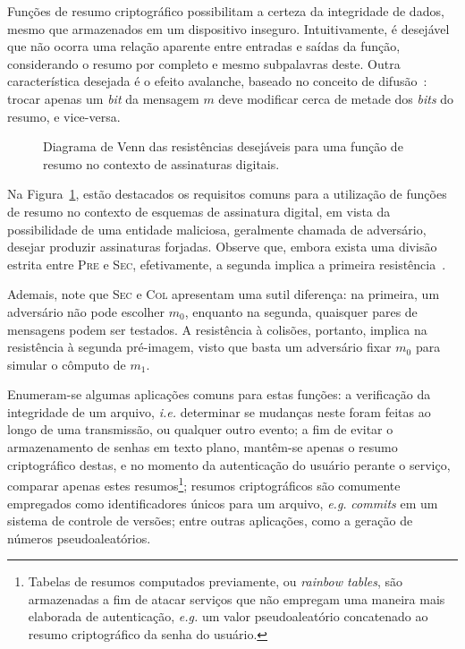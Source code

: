 \documentclass{ufsctex/ufsctex}
\begin{document}
Funções de resumo criptográfico possibilitam a certeza da integridade de dados,
mesmo que armazenados em um dispositivo inseguro. Intuitivamente, é desejável
que não ocorra uma relação aparente entre entradas e saídas da função,
considerando o resumo por completo e mesmo subpalavras deste. Outra
característica desejada é o efeito avalanche, baseado no conceito de
difusão~\cite[pp. 72]{Stallings:book:2010}: trocar apenas um \emph{bit} da
mensagem $m$ deve modificar cerca de metade dos \emph{bits} do resumo, e
vice-versa.

\begin{figure}
  \centering
  \caption{Diagrama de Venn das resistências desejáveis para uma função de
    resumo no contexto de assinaturas digitais.}\label{fig:1}
\end{figure}

Na Figura~\ref{fig:1}, estão destacados os requisitos comuns para a utilização
de funções de resumo no contexto de esquemas de assinatura digital, em vista da
possibilidade de uma entidade maliciosa, geralmente chamada de adversário,
desejar produzir assinaturas forjadas. Observe que, embora exista uma divisão
estrita entre \textsc{Pre} e \textsc{Sec}, efetivamente, a segunda implica a
primeira resistência~\cite[Nota 9.20]{Menezes:book:1996}.

Ademais, note que \textsc{Sec} e \textsc{Col} apresentam uma sutil diferença:
na primeira, um adversário não pode escolher $m_{0}$, enquanto na segunda,
quaisquer pares de mensagens podem ser testados. A resistência à colisões,
portanto, implica na resistência à segunda pré-imagem, visto que basta um
adversário fixar $m_{0}$ para simular o cômputo de $m_{1}$.

Enumeram-se algumas aplicações comuns para estas funções: a verificação da
integridade de um arquivo, \emph{i.e.} determinar se mudanças neste foram
feitas ao longo de uma transmissão, ou qualquer outro evento; a fim de evitar o
armazenamento de senhas em texto plano, mantêm-se apenas o resumo criptográfico
destas, e no momento da autenticação do usuário perante o serviço, comparar
apenas estes resumos\footnote{Tabelas de resumos computados previamente, ou
\emph{rainbow tables}, são armazenadas a fim de atacar serviços que não
empregam uma maneira mais elaborada de autenticação, \emph{e.g.} um valor
pseudoaleatório concatenado ao resumo criptográfico da senha do usuário.};
resumos criptográficos são comumente empregados como identificadores únicos
para um arquivo, \emph{e.g.} \emph{commits} em um sistema de controle de
versões; entre outras aplicações, como a geração de números pseudoaleatórios.
\end{document}
